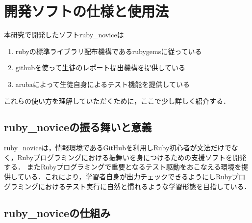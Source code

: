 
\section{開発ソフトの仕様と使用法}
本研究で開発したソフトruby\_noviceは

\begin{enumerate}
\item rubyの標準ライブラリ配布機構であるrubygemsに従っている
\item githubを使って生徒のレポート提出機構を提供している
\item arubaによって生徒自身によるテスト機能を提供している
\end{enumerate}
これらの使い方を理解していただくために，ここで少し詳しく紹介する．

\subsection{ruby\_noviceの振る舞いと意義}
ruby\_noviceは，情報環境であるGitHubを利用しRuby初心者が文法だけでなく，Rubyプログラミングにおける振舞いを身につけるための支援ソフトを開発する．
またRubyプログラミングで重要となるテスト駆動をおこなえる環境を提供している．これにより，学習者自身が出力チェックできるようにしRubyプログラミングにおけるテスト実行に自然と慣れるような学習形態を目指している．

\subsection{ruby\_noviceの仕組み}

